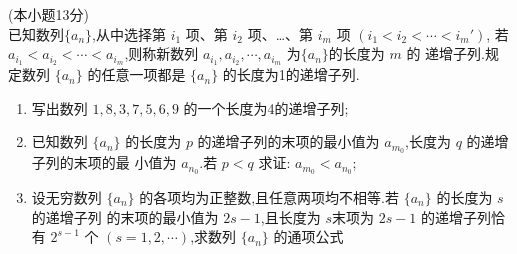 \documentclass[class=ctexart,crop=false]{standalone}
\begin{document}
(本小题13分)\\
已知数列$\{a_n\}$,从中选择第 $i_1$ 项、第 $i_2$ 项、\dots、第 $i_m$ 项 $(i_1<i_2<\cdots<i_m')$,
若 $a_{i_1}<a_{i_2}<\cdots<a_{i_m}$,则称新数列 $a_{i_1},a_{i_2},\cdots,a_{i_m}$ 为$\{a_n\}$的长度为 $m$ 的
递增子列.规定数列 $\{a_n\}$ 的任意一项都是 $\{a_n\}$ 的长度为1的递增子列.
\begin{enumerate}[label=(\Roman*)]
    \item 写出数列 $1,8,3,7,5,6,9$ 的一个长度为4的递增子列; 
    \item 已知数列 $\{a_n\}$ 的长度为 $p$ 的递增子列的末项的最小值为 $a_{m_0}$,长度为 $q$ 的递增子列的末项的最
    小值为 $a_{n_0}$.若 $p<q$ 求证: $a_{m_0}<a_{n_0}$;
    \item 设无穷数列 $\{a_n\} $ 的各项均为正整数,且任意两项均不相等.若 $\{a_n\}$ 的长度为 $s$ 的递增子列
    的末项的最小值为 $2s-1$,且长度为 $s$末项为 $2s-1$ 的递增子列恰有 $2^{s-1}$ 个 $(s=1,2,\cdots)$,求数列 $\{a_n\}$ 
    的通项公式 
\end{enumerate}
\end{document}
